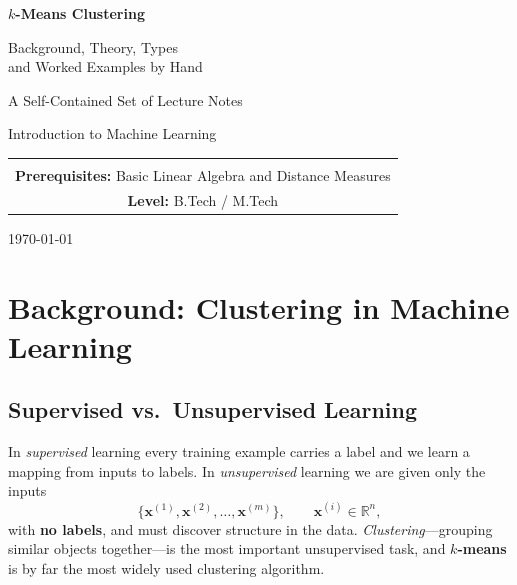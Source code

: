 \documentclass[11pt,a4paper]{report}
\theoremstyle{definition}
\theoremstyle{plain}
\theoremstyle{remark}
\newcommand{\R}{\mathbb{R}}
\newcommand{\vx}{\mathbf{x}}
\begin{document}
	
	\begin{titlepage}
		\centering
		\vspace*{2cm}
		{\Huge\bfseries $k$-Means Clustering\par}
		\vspace{0.6cm}
		{\Large Background, Theory, Types\\[2pt]
			and Worked Examples by Hand\par}
		\vspace{1.5cm}
		{\large A Self-Contained Set of Lecture Notes\par}
		\vspace{0.4cm}
		{\large Introduction to Machine Learning\par}
		\vspace{2.5cm}
		\begin{tabular}{c}
			\hline\\[-6pt]
			\textbf{Prerequisites:} Basic Linear Algebra and Distance Measures\\[4pt]
			\textbf{Level:} B.Tech / M.Tech\\[4pt]
			\hline
		\end{tabular}
		\vfill
		{\large \today\par}
	\end{titlepage}
	
	\tableofcontents
	\clearpage
	
	\chapter{Background: Clustering in Machine Learning}
	
	\section{Supervised vs.\ Unsupervised Learning}
	In \emph{supervised} learning every training example carries a label and we
	learn a mapping from inputs to labels. In \emph{unsupervised} learning we are
	given only the inputs
	\[
	\{\vx^{(1)},\vx^{(2)},\dots,\vx^{(m)}\},\qquad \vx^{(i)}\in\R^{n},
	\]
	with \textbf{no labels}, and must discover structure in the data.
	\emph{Clustering}---grouping similar objects together---is the most important
	unsupervised task, and \textbf{$k$-means} is by far the most widely used
	clustering algorithm.
	
\end{document}
